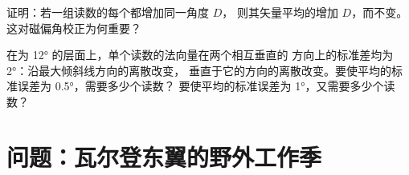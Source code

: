 \begin{exercise}[$\star\star\star$]\label{exo:b1:field-lab-methods-1:11}
证明：若一组读数的每个都增加同一角度 $D$，
则其矢量平均的增加 $D$，而不变。
这对磁偏角校正为何重要？
\end{exercise}

\begin{exercise}[$\star\star\star$]\label{exo:b1:field-lab-methods-1:12}
在为 \ang{12} 的层面上，单个读数的法向量在两个相互垂直的
方向上的标准差均为 \ang{2}：沿最大倾斜线方向的离散改变，
垂直于它的方向的离散改变。要使平均的标准误差为
\ang{0.5}，需要多少个读数？
要使平均的标准误差为 \ang{1}，又需要多少个读数？
\end{exercise}

\section{问题：瓦尔登东翼的野外工作季}

